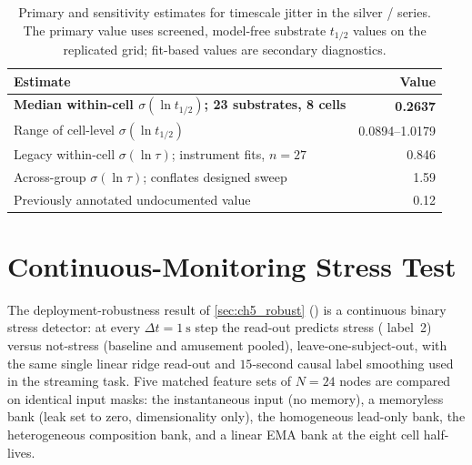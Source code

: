 \begin{table}[t]
  \centering
  \caption[Measured substrate-to-substrate scatter of the fading-memory time]{Primary and sensitivity estimates for timescale jitter in the silver \PEO{}/\LiTf{} series. The primary value uses screened, model-free substrate $t_{1/2}$ values on the replicated grid; fit-based values are secondary diagnostics.}
  \label{tab:ch5_scatter}
  \footnotesize
  \setlength{\tabcolsep}{5pt}
  \begin{tabularx}{\linewidth}{@{}>{\raggedright\arraybackslash}X r@{}}
    \toprule
    Estimate & Value \\
    \midrule
    \textbf{Median within-cell $\sigma(\ln t_{1/2})$; 23 substrates, 8 cells} & \textbf{\num{0.2637}} \\
    Range of cell-level $\sigma(\ln t_{1/2})$ & \numrange{0.0894}{1.0179} \\
    Legacy within-cell $\sigma(\ln\tau)$; instrument fits, $n=27$ & \num{0.846} \\
    Across-group $\sigma(\ln\tau)$; conflates designed sweep & \num{1.59} \\
    Previously annotated undocumented value & \num{0.12} \\
    \bottomrule
  \end{tabularx}
\end{table}

\section{Continuous-Monitoring Stress Test}\label{app:ch5_robust}

The deployment-robustness result of \cref{sec:ch5_robust} ()
is a continuous binary stress detector: at every $\Delta t = \SI{1}{\second}$ step the
read-out predicts stress (\WESAD{} label~2) versus not-stress (baseline and amusement
pooled), leave-one-subject-out, with the same single linear ridge read-out and
$15$-second causal label smoothing used in the streaming task. Five matched feature sets of
$N=24$ nodes are compared on identical input masks: the instantaneous input (no
memory), a memoryless bank (leak set to zero, dimensionality only), the homogeneous
lead-only bank, the heterogeneous composition bank, and a linear EMA bank at the eight cell half-lives.


